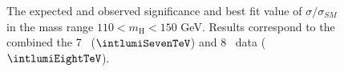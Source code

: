 \begin{figure}[!hbtp]
\centering
\subfigure[Significance]{
\centering
\label{subfig:significance_8TeV}
}
\label{fig:sig_mu_finalcomb}
\caption{\fixme
The expected and observed significance and best 
fit value of $\sigma/\sigma_{SM}$ in the mass 
range $110<\ensuremath{m_{\mathrm{H}}}<150$ GeV. 
Results correspond to the combined the 7 \TeV\ ($\intlumiSevenTeV$) and 8 \TeV\ data ($\intlumiEightTeV$).}
\end{figure}%
